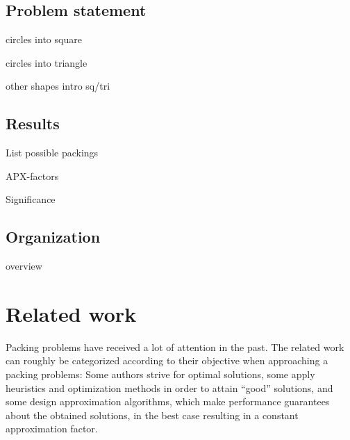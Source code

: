 \documentclass[a4paper,style=print,bibliography=totoc,nexus,lnum,extramargin]{tubsbook}
\begin{document}

\section{Problem statement}

circles into square

circles into triangle

other shapes intro sq/tri

\section{Results}

List possible packings

APX-factors

Significance

%
%
%

\section{Organization}

overview

\chapter{Related work}

Packing problems have received a lot of attention in the past. The related work can roughly be categorized according to their objective when approaching a packing problems: Some authors strive for optimal solutions, some apply heuristics and optimization methods in order to attain “good” solutions, and some design approximation algorithms, which make performance guarantees about the obtained solutions, in the best case resulting in a constant approximation factor.
\end{document}
